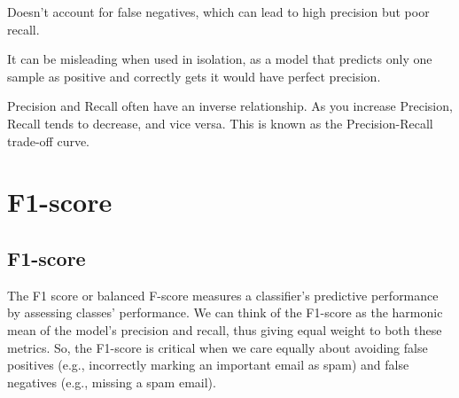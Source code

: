 {
\item Doesn't account for false negatives, which can lead to high precision but poor recall.
\item It can be misleading when used in isolation, as a model that predicts only one sample as positive and correctly gets it would have perfect precision.
}

{
    Precision and Recall often have an inverse relationship. As you increase Precision, Recall tends to decrease, and vice versa.
    This is known as the Precision-Recall trade-off curve.
}

\clearpage
\thispagestyle{classificationstyle}
\section{F1-score}
\subsection{F1-score}

The F1 score or balanced F-score measures a classifier's predictive performance by assessing classes' performance. We can think of the F1-score as the harmonic mean of the model’s
precision and recall, thus giving equal weight to both these metrics. So, the F1-score is critical when we care equally about avoiding false positives
(e.g., incorrectly marking an important email as spam) and false negatives (e.g., missing a spam email).


\begin{center}
\end{center}

